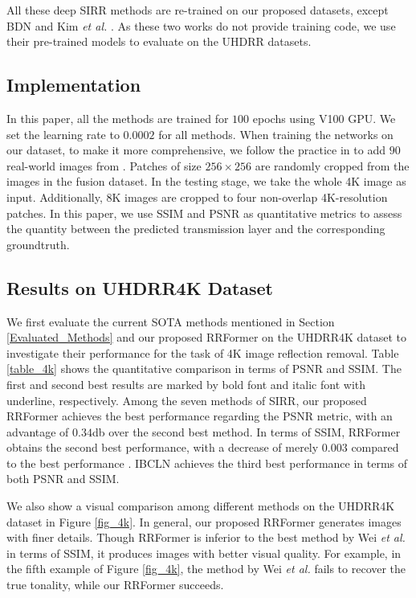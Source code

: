 \documentclass[10pt,journal]{IEEEtran}
\begin{document}
All these deep SIRR methods are re-trained on our proposed datasets, except BDN \cite{yangSeeingDeeplyBidirectionally2018} and Kim \textit{et al.} \cite{kimSingleImageReflection2020}. As these two works do not provide training code, we use their pre-trained models to evaluate on the UHDRR datasets. 

\subsection{Implementation}
In this paper, all the methods are trained for $100$ epochs using V100 GPU. We set the learning rate to $0.0002$ for all methods. When training the networks on our dataset, to make it more comprehensive, we follow the practice in \cite{weiSingleImageReflection2019} to add $90$ real-world images from \cite{zhangSingleImageReflection2018}. 
Patches of size $256 \times 256$ are randomly cropped from the images in the fusion dataset.
In the testing stage, we take the whole 4K image as input. Additionally, 8K images are cropped to four non-overlap 4K-resolution patches. In this paper, we use SSIM and PSNR as quantitative metrics to assess the quantity between the predicted transmission layer and the corresponding groundtruth. 


\subsection{Results on UHDRR4K Dataset}
We first evaluate the current SOTA methods mentioned in Section \ref{Evaluated_Methods} and our proposed RRFormer on the UHDRR4K dataset to investigate their performance for the task of 4K image reflection removal. Table \ref{table_4k} shows the quantitative comparison in terms of PSNR and SSIM.
The first and second best results are marked by bold font and italic font with underline, respectively. 
Among the seven methods of SIRR, our proposed RRFormer achieves the best performance regarding the PSNR metric, with an advantage of $0.34$db over the second best method.
In terms of SSIM, RRFormer obtains the second best performance, with a decrease of merely $0.003$ compared to the best performance \cite{weiSingleImageReflection2019}. 
IBCLN \cite{liSingleImageReflection2020} achieves the third best performance in terms of both PSNR and SSIM. 

We also show a visual comparison among different methods on the UHDRR4K dataset in Figure \ref{fig_4k}. In general, our proposed RRFormer generates images with finer details. 
Though RRFormer is inferior to the best method by Wei \textit{et al.} \cite{weiSingleImageReflection2019} in terms of SSIM, it produces images with better visual quality. For example, in the fifth example of Figure \ref{fig_4k}, the method by Wei \textit{et al.} \cite{weiSingleImageReflection2019} fails to recover the true tonality, while our RRFormer succeeds.
\end{document}

